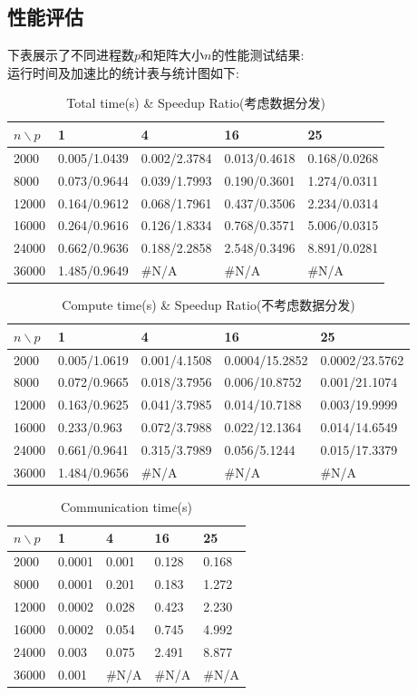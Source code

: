 \documentclass[UTF8, onecolumn, a4paper]{article}
\begin{document}
\subsection{性能评估}
下表展示了不同进程数$p$和矩阵大小$n$的性能测试结果:\\
运行时间及加速比的统计表与统计图如下:
\begin{table}[htb]
	\centering
	\begin{tabular}{l|llll}
		\hline
		$n \backslash p$& 1 & 4 & 16 & 25 \\ \hline
		2000 & 0.005/1.0439 & 0.002/2.3784 & 0.013/0.4618 & 0.168/0.0268 \\ \hline
		8000 & 0.073/0.9644 & 0.039/1.7993 & 0.190/0.3601 & 1.274/0.0311 \\ \hline
		12000 & 0.164/0.9612 & 0.068/1.7961 & 0.437/0.3506 & 2.234/0.0314 \\ \hline
		16000 & 0.264/0.9616 & 0.126/1.8334 & 0.768/0.3571 & 5.006/0.0315 \\ \hline
		24000 & 0.662/0.9636 & 0.188/2.2858 & 2.548/0.3496 & 8.891/0.0281 \\ \hline
		36000 & 1.485/0.9649 & \#N/A & \#N/A & \#N/A \\ \hline
	\end{tabular}
	\caption{Total time(s) \& Speedup Ratio(考虑数据分发)}
\end{table}
\begin{table}[htb]
	\centering
	\begin{tabular}{l|llll}
		\hline
		$n \backslash p$& 1 & 4 & 16 & 25 \\ \hline
		2000 & 0.005/1.0619 & 0.001/4.1508 & 0.0004/15.2852 & 0.0002/23.5762 \\ \hline
		8000 & 0.072/0.9665 & 0.018/3.7956 & 0.006/10.8752 & 0.001/21.1074 \\ \hline
		12000 & 0.163/0.9625 & 0.041/3.7985 & 0.014/10.7188 & 0.003/19.9999 \\ \hline
		16000 & 0.233/0.963 & 0.072/3.7988 & 0.022/12.1364 & 0.014/14.6549 \\ \hline
		24000 & 0.661/0.9641 & 0.315/3.7989 & 0.056/5.1244 & 0.015/17.3379 \\ \hline
		36000 & 1.484/0.9656 & \#N/A & \#N/A & \#N/A \\ \hline
	\end{tabular}
	\caption{Compute time(s) \& Speedup Ratio(不考虑数据分发)}
\end{table}
\begin{table}[htb]
	\centering
	\begin{tabular}{l|llll}
		\hline
		$n \backslash p$& 1 & 4 & 16 & 25 \\ \hline
		2000 & 0.0001 & 0.001 & 0.128 & 0.168 \\ \hline
		8000 & 0.0001 & 0.201 & 0.183 & 1.272 \\ \hline
		12000 & 0.0002 & 0.028 & 0.423 & 2.230 \\ \hline
		16000 & 0.0002 & 0.054 & 0.745 & 4.992 \\ \hline
		24000 & 0.003 & 0.075 & 2.491 & 8.877 \\ \hline
		36000 & 0.001 & \#N/A & \#N/A & \#N/A \\ \hline
	\end{tabular}
	\caption{Communication time(s)}
\end{table}
\end{document}

